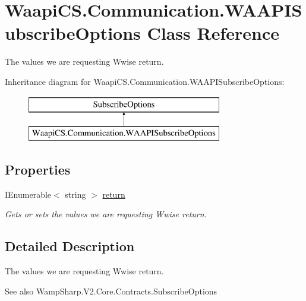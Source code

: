 \hypertarget{class_waapi_c_s_1_1_communication_1_1_w_a_a_p_i_subscribe_options}{}\section{Waapi\+C\+S.\+Communication.\+W\+A\+A\+P\+I\+Subscribe\+Options Class Reference}
\label{class_waapi_c_s_1_1_communication_1_1_w_a_a_p_i_subscribe_options}


The values we are requesting Wwise return.  


Inheritance diagram for Waapi\+C\+S.\+Communication.\+W\+A\+A\+P\+I\+Subscribe\+Options\+:\begin{figure}[H]
\begin{center}
\leavevmode
\includegraphics[height=2.000000cm]{class_waapi_c_s_1_1_communication_1_1_w_a_a_p_i_subscribe_options}
\end{center}
\end{figure}
\subsection*{Properties}
\begin{DoxyCompactItemize}
\item 
I\+Enumerable$<$ string $>$ \mbox{\hyperlink{class_waapi_c_s_1_1_communication_1_1_w_a_a_p_i_subscribe_options_a2def35365ed52c59a777d0039c2fde60}{return}}
\begin{DoxyCompactList}\small\item\em Gets or sets the values we are requesting Wwise return. \end{DoxyCompactList}\end{DoxyCompactItemize}


\subsection{Detailed Description}
The values we are requesting Wwise return. 

\begin{DoxySeeAlso}{See also}
Wamp\+Sharp.\+V2.\+Core.\+Contracts.\+Subscribe\+Options


\end{DoxySeeAlso}



